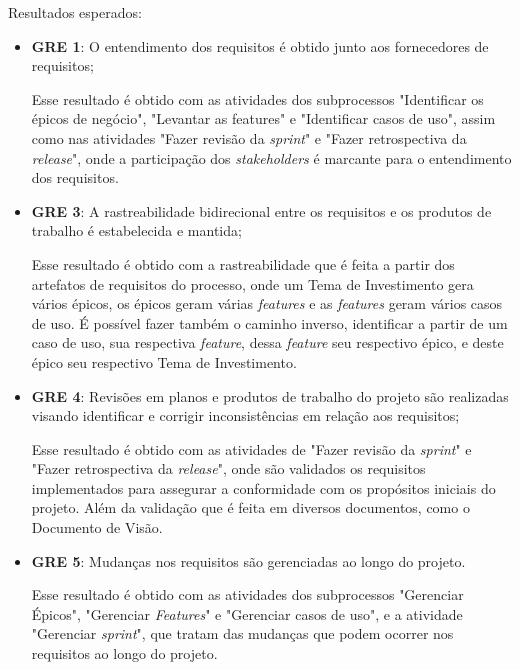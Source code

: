 	  \noindent
	  Resultados esperados:
	  
	  \begin{itemize}
	    
	    \item \textbf{GRE 1}: O entendimento dos requisitos é obtido junto aos fornecedores de requisitos;
	      
	      Esse resultado é obtido com as atividades dos subprocessos "Identificar os épicos de negócio", "Levantar as features" 
	      e "Identificar casos de uso", assim como nas atividades "Fazer revisão da \textit{sprint}" 
	      e "Fazer retrospectiva da \textit{release}", onde a participação dos \textit{stakeholders} é marcante para
	      o entendimento dos requisitos.
		  
	    \item \textbf{GRE 3}: A rastreabilidade bidirecional entre os requisitos e os produtos de trabalho é estabelecida e mantida;
	      
	      Esse resultado é obtido com a rastreabilidade que é feita a partir dos artefatos de requisitos do processo,
	      onde um Tema de Investimento gera vários épicos, os épicos geram várias \textit{features} e 
	      as \textit{features} geram vários casos de uso. É possível fazer também o caminho inverso,
	      identificar a partir de um caso de uso, sua respectiva \textit{feature}, dessa \textit{feature} seu respectivo épico, e 
	      deste épico seu respectivo Tema de Investimento.
	    
	    \item \textbf{GRE 4}: Revisões em planos e produtos de trabalho do projeto são realizadas visando identificar
	      e corrigir inconsistências em relação aos requisitos;
	    
	      Esse resultado é obtido com as atividades de "Fazer revisão da \textit{sprint}" 
	      e "Fazer retrospectiva da \textit{release}", onde são validados os requisitos implementados para assegurar
	      a conformidade com os propósitos iniciais do projeto. Além da validação que é feita em diversos documentos,
	      como o Documento de Visão.
	    
	    \item \textbf{GRE 5}: Mudanças nos requisitos são gerenciadas ao longo do projeto.
	    
	      Esse resultado é obtido com as atividades dos subprocessos "Gerenciar Épicos", "Gerenciar \textit{Features}"  e
	      "Gerenciar casos de uso", e a atividade "Gerenciar \textit{sprint}", que tratam das mudanças que podem ocorrer
	      nos requisitos ao longo do projeto.
	      
	  \end{itemize}

